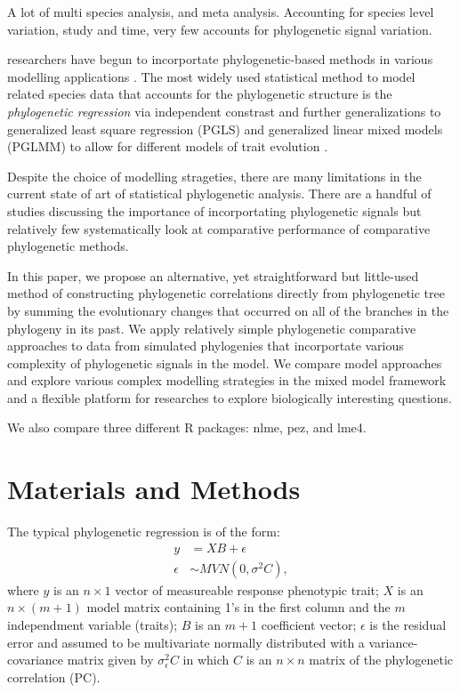 \documentclass[12pt]{article}
\begin{document}
A lot of multi species analysis, and meta analysis. Accounting for species level variation, study and time, very few accounts for phylogenetic signal variation. 


researchers have begun to incorportate phylogenetic-based methods in various modelling applications .
The most widely used statistical method to model related species data that accounts for the phylogenetic structure is the \textit{phylogenetic regression} via independent constrast  and further generalizations to generalized least square regression (PGLS) and generalized linear mixed models (PGLMM) to allow for different models of trait evolution . 


Despite the choice of modelling strageties, there are many limitations in the current state of art of statistical phylogenetic analysis.
There are a handful of studies discussing the importance of incorportating phylogenetic signals but relatively few systematically look at comparative performance of comparative phylogenetic methods. 

In this paper, we propose an alternative, yet straightforward but little-used method of constructing phylogenetic correlations directly from phylogenetic tree by summing the evolutionary changes that occurred on all of the branches in the phylogeny in its past.
We apply relatively simple phylogenetic comparative approaches to data from simulated phylogenies that incorportate various complexity of phylogenetic signals in the model. 
We compare model approaches and explore various complex modelling strategies in the mixed model framework and a flexible platform for researches to explore biologically interesting questions.

We also compare three different R packages: nlme, pez, and lme4. 

\section{Materials and Methods}

The typical phylogenetic regression is of the form:
\begin{align}
y & = XB + \epsilon \\
\epsilon & \sim MVN(0,\sigma^{2}C),
\label{eq:gls}
\end{align}
where $y$ is an $n \times 1$ vector of measureable response phenotypic trait; $X$ is an $n \times (m + 1)$ model matrix containing 1's in the first column and the $m$ independment variable (traits); $B$ is an $m + 1$ coefficient vector; $\epsilon$ is the residual error and assumed to be multivariate normally distributed with a variance-covariance matrix given by $\sigma^{2}_{\epsilon}C$ in which $C$ is an $n \times n$ matrix of the phylogenetic correlation (PC).
\end{document}
